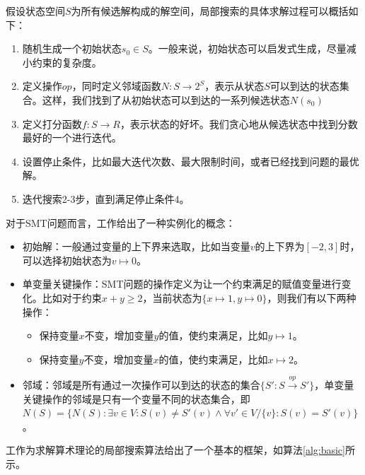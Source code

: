 假设状态空间$S$为所有候选解构成的解空间，局部搜索的具体求解过程可以概括如下：
\begin{enumerate}
    \item 随机生成一个初始状态$s_0 \in S$。一般来说，初始状态可以启发式生成，尽量减小约束的复杂度。
    \item 定义操作$op$，同时定义邻域函数$N: S \rightarrow 2^S$，表示从状态$S$可以到达的状态集合。这样，我们找到了从初始状态可以到达的一系列候选状态$N(s_0)$
    \item 定义打分函数$f: S \rightarrow R$，表示状态的好坏。我们贪心地从候选状态中找到分数最好的一个进行迭代。
    \item 设置停止条件，比如最大迭代次数、最大限制时间，或者已经找到问题的最优解。
    \item 迭代搜索2-3步，直到满足停止条件4。
\end{enumerate}
对于SMT问题而言，工作\cite{CaiLZ2023}给出了一种实例化的概念：
\begin{itemize}
    \item 初始解：一般通过变量的上下界来选取，比如当变量$v$的上下界为$[-2, 3]$时，可以选择初始状态为$v \mapsto 0$。
    \item 单变量关键操作：SMT问题的操作定义为让一个约束满足的赋值变量进行变化。比如对于约束$x + y \geq 2$，当前状态为$\{x \mapsto 1, y \mapsto 0\}$，则我们有以下两种操作：
    \begin{itemize}
        \item 保持变量$x$不变，增加变量$y$的值，使约束满足，比如$y \mapsto 1$。
        \item 保持变量$y$不变，增加变量$x$的值，使约束满足，比如$x \mapsto 2$。
    \end{itemize}

    \item 邻域：邻域是所有通过一次操作可以到达的状态的集合$\{S' : S \xrightarrow{op} S'\}$，单变量关键操作的邻域是只有一个变量不同的状态集合，即$N(S) = \{N(S): \exists v \in V: S(v) \neq S'(v) \land \forall v' \in V / \{v\}: S(v) = S'(v) \}$。
\end{itemize}

工作\cite{CaiLZ2023}为求解算术理论的局部搜索算法给出了一个基本的框架，如算法\ref{alg:basic}所示。


